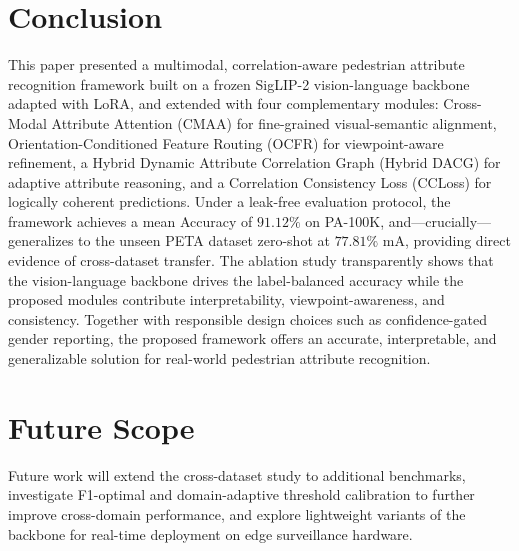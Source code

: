 \documentclass{ieeeaccess}
\begin{document}
\section{Conclusion}
\label{sec:conclusion}
This paper presented a multimodal, correlation-aware pedestrian attribute recognition framework built
on a frozen SigLIP-2 vision-language backbone adapted with LoRA, and extended with four complementary
modules: Cross-Modal Attribute Attention (CMAA) for fine-grained visual-semantic alignment,
Orientation-Conditioned Feature Routing (OCFR) for viewpoint-aware refinement, a Hybrid Dynamic
Attribute Correlation Graph (Hybrid DACG) for adaptive attribute reasoning, and a Correlation
Consistency Loss (CCLoss) for logically coherent predictions. Under a leak-free evaluation protocol,
the framework achieves a mean Accuracy of $91.12\%$ on PA-100K, and---crucially---generalizes to the
unseen PETA dataset zero-shot at $77.81\%$ mA, providing direct evidence of cross-dataset transfer.
The ablation study transparently shows that the vision-language backbone drives the label-balanced
accuracy while the proposed modules contribute interpretability, viewpoint-awareness, and consistency.
Together with responsible design choices such as confidence-gated gender reporting, the proposed
framework offers an accurate, interpretable, and generalizable solution for real-world pedestrian
attribute recognition.

\section{Future Scope}
Future work will extend the cross-dataset study to additional benchmarks, investigate F1-optimal and
domain-adaptive threshold calibration to further improve cross-domain performance, and explore
lightweight variants of the backbone for real-time deployment on edge surveillance hardware.



%


\end{document}
